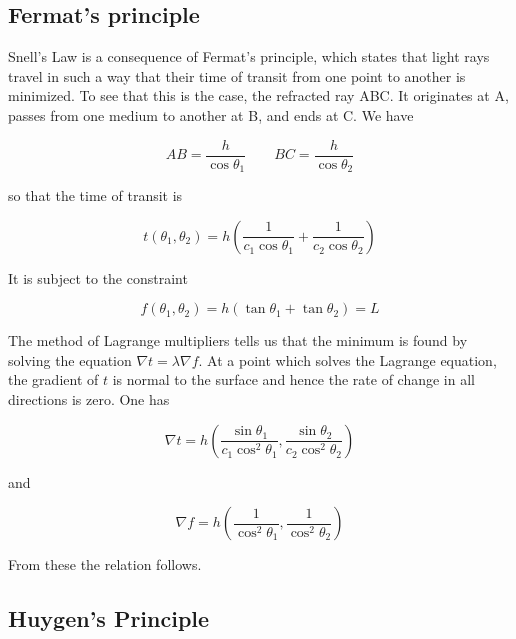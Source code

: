 \subsection{Fermat's principle}

 Snell's Law is a consequence of Fermat's principle, which states that light rays travel in such a way that their time of transit from one point to another is minimized. To see that this is the case, the refracted ray ABC.  It originates at A, passes from one medium to another at B, and ends at C. We have

\begin{equation}
AB = \frac{h}{\cos \theta_1} \qquad BC= \frac{h}{\cos \theta_2}
\end{equation}

so that the time of transit is

\begin{equation}
t(\theta_1, \theta_2) = h\left(
\frac{1}{c_1\cos\theta_1}  + \frac{1}{c_2\cos\theta_2} \right)
\end{equation}

It is subject to the constraint

\begin{equation}
f(\theta_1, \theta_2)  = h(\tan\theta_1 + \tan\theta_2) = L
\end{equation}



The method of Lagrange multipliers tells us that the minimum is found by solving the equation $\nabla t = \lambda \nabla f$.  At a point which solves the Lagrange equation, the gradient of $t$ is normal to the surface and hence the rate of change in all directions is zero. One has

\begin{equation}
\nabla t = h\left(\frac{\sin \theta_1}{c_1 \cos^2 \theta_1},
\frac{\sin \theta_2}{c_2 \cos^2 \theta_2}\right)
\end{equation}

and

\begin{equation}
\nabla f = h\left(\frac{1}{\cos^2 \theta_1},
\frac{1}{\cos^2 \theta_2}\right)
\end{equation}

From these the relation follows.




\subsection{Huygen's Principle}


